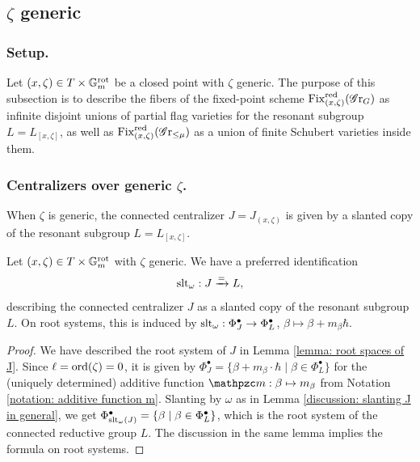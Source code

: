 \subsection{\texorpdfstring{$\zeta$}{Zeta} generic}\label{section: zeta generic}
\subsubsection{Setup.}
Let $(x, \zeta) \in T \times \mathbb{G}_m^{\mathrm{rot}}$ be a closed point with $\zeta$ generic. The purpose of this subsection is to describe the fibers of the fixed-point scheme $\operatorname{Fix}^{\operatorname{red}}_{(x, \zeta)}(\operatorname{\mathscr{G}r}_G)$ as infinite disjoint unions of partial flag varieties for the resonant subgroup $L = L_{[x, \zeta]}$, as well as $\operatorname{Fix}^{\operatorname{red}}_{(x, \zeta)}(\operatorname{\mathscr{G}r}_{\leq \mu})$ as a union of finite Schubert varieties inside them.

\subsubsection{Centralizers over generic $\zeta$.}
When $\zeta$ is generic, the connected centralizer $J = J_{(x, \zeta)}$ is given by a slanted copy of the resonant subgroup $L = L_{[x, \zeta]}$.
\begin{lemma}\label{lemma: centralizer as resonant subgroup -- generic zeta}
Let $(x, \zeta) \in T \times \mathbb{G}_m^{\mathrm{rot}}$ with $\zeta$ generic. We have a preferred identification
\begin{equation*}
    \operatorname{slt}_{\omega}: J \xrightarrow{=} L,
\end{equation*}
describing the connected centralizer $J$ as a slanted copy of the resonant subgroup $L$. On root systems, this is induced by
$\operatorname{slt}_{\omega}: \Phi^{\bullet}_J \to \Phi^{\bullet}_L $, $\beta \mapsto \beta + m_{\beta}\hbar$.
\end{lemma}
\begin{proof}
We have described the root system of $J$ in Lemma \ref{lemma: root spaces of J}. Since $\ell = \mathrm{ord}(\zeta)=0$, it is given by $ \Phi^{\bullet}_J = \{ \beta + m_{\beta} \cdot \hbar \mid \beta \in \Phi^{\bullet}_L \}$ for the (uniquely determined) additive function $\mm: \beta \mapsto m_{\beta}$ from Notation \ref{notation: additive function m}.
Slanting by $\omega$ as in Lemma \ref{discussion: slanting J in general}, we get
$\Phi^{\bullet}_{\operatorname{slt}_{\omega}(J)} = \{ \beta \mid \beta \in \Phi^{\bullet}_L \}$, which is the root system of the connected reductive group $L$. The discussion in the same lemma implies the formula on root systems.
\end{proof}



